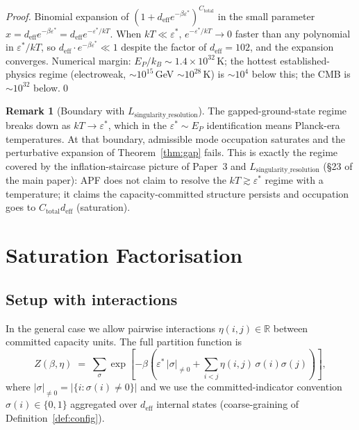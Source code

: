 \documentclass[11pt,a4paper]{article}
\theoremstyle{definition}
\newtheorem{remark}[theorem]{Remark}
\newcommand{\epsstar}{\varepsilon^{\ast}}
\newcommand{\Ctot}{C_{\mathrm{total}}}
\newcommand{\deff}{d_{\mathrm{eff}}}
\begin{document}
\begin{proof}
Binomial expansion of $(1+\deff e^{-\beta\epsstar})^{\Ctot}$ in the small parameter $x=\deff e^{-\beta\epsstar}=\deff e^{-\epsstar/kT}$.  When $kT\ll\epsstar$, $e^{-\epsstar/kT}\to 0$ faster than any polynomial in $\epsstar/kT$, so $\deff\cdot e^{-\beta\epsstar}\ll 1$ despite the factor of $\deff=102$, and the expansion converges.  Numerical margin: $E_P/k_B\sim 1.4\times 10^{32}$\,K; the hottest established-physics regime (electroweak, $\sim 10^{15}$\,GeV $\sim 10^{28}$\,K) is $\sim 10^{4}$ below this; the CMB is $\sim 10^{32}$ below.\qed
\end{proof}

\begin{remark}[Boundary with $L_{\mathrm{singularity\_resolution}}$]
The gapped-ground-state regime breaks down as $kT\to\epsstar$, which in the $\epsstar\sim E_P$ identification means Planck-era temperatures.  At that boundary, admissible mode occupation saturates and the perturbative expansion of Theorem~\ref{thm:gap} fails.  This is exactly the regime covered by the inflation-staircase picture of Paper~3 and $L_{\mathrm{singularity\_resolution}}$ (§23 of the main paper): APF does not claim to resolve the $kT\gtrsim\epsstar$ regime with a temperature; it claims the capacity-committed structure persists and occupation goes to $\Ctot\deff$ (saturation).
\end{remark}

\section{Saturation Factorisation}\label{sec:Zsat}
\setcounter{theorem}{0}

\subsection{Setup with interactions}

In the general case we allow pairwise interactions $\eta(i,j)\in\mathbb{R}$ between committed capacity units.  The full partition function is
\[
  Z(\beta,\eta) \;=\; \sum_{\sigma} \exp\!\left[-\beta\!\left(\epsstar\,|\sigma|_{\neq 0} + \sum_{i<j}\eta(i,j)\,\sigma(i)\sigma(j)\right)\right],
\]
where $|\sigma|_{\neq 0}=|\{i:\sigma(i)\neq 0\}|$ and we use the committed-indicator convention $\sigma(i)\in\{0,1\}$ aggregated over $\deff$ internal states (coarse-graining of Definition~\ref{def:config}).
\end{document}
